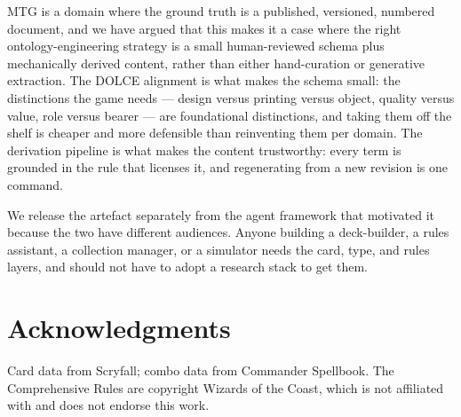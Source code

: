 \documentclass[11pt,a4paper]{article}
\begin{document}
MTG is a domain where the ground truth is a published, versioned, numbered document, and we have argued that this makes it a case where the right ontology-engineering strategy is a small human-reviewed schema plus mechanically derived content, rather than either hand-curation or generative extraction. The DOLCE alignment is what makes the schema small: the distinctions the game needs --- design versus printing versus object, quality versus value, role versus bearer --- are foundational distinctions, and taking them off the shelf is cheaper and more defensible than reinventing them per domain. The derivation pipeline is what makes the content trustworthy: every term is grounded in the rule that licenses it, and regenerating from a new revision is one command.

We release the artefact separately from the agent framework that motivated it because the two have different audiences. Anyone building a deck-builder, a rules assistant, a collection manager, or a simulator needs the card, type, and rules layers, and should not have to adopt a research stack to get them.

\section*{Acknowledgments}
\noindent Card data from Scryfall; combo data from Commander Spellbook. The Comprehensive Rules are copyright Wizards of the Coast, which is not affiliated with and does not endorse this work.



\end{document}
